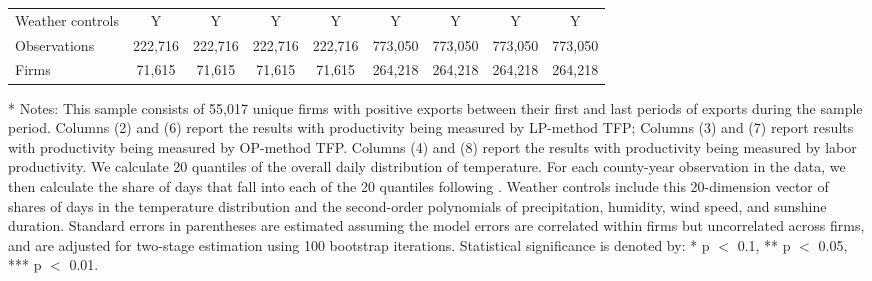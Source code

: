 \documentclass[12pt]{article}
\begin{document}
\begin{table}[H]
{\begin{tabular}{l*{8}{c}}
      \hline
      Weather controls     &Y&Y&Y&Y&Y&Y&Y&Y\\
      Observations        &222,716&222,716&222,716&222,716&773,050&773,050&773,050&773,050\\
      Firms               &71,615 & 71,615&71,615&71,615&264,218	&264,218&264,218&264,218 \\
      \hline\hline
    \end{tabular}
    }
    \begin{tablenotes}
      \item[*] \small Notes: This sample consists of 55,017 unique firms with positive exports between their first and last periods of exports during the sample period. Columns (2) and (6) report the results with productivity being measured by LP-method TFP;
      Columns (3) and (7) report results with productivity being measured by OP-method TFP. Columns (4) and (8) report the results with productivity being measured by labor productivity. We calculate 20 quantiles of the overall daily distribution of temperature. For each county-year observation in the data, we then calculate the share of days that fall into each of the 20 quantiles following \citep{deschenes2017defensive}. Weather controls include this 20-dimension vector of shares of days in the temperature distribution and the second-order polynomials of precipitation, humidity, wind speed, and sunshine duration. Standard errors in parentheses are estimated assuming the model errors are correlated within firms but uncorrelated across firms, and are adjusted for two-stage estimation using 100 bootstrap iterations. Statistical significance is denoted by: * p $<$ 0.1, ** p $<$ 0.05, *** p $<$ 0.01.
    \end{tablenotes}
  \end{table}
  
\end{document}
